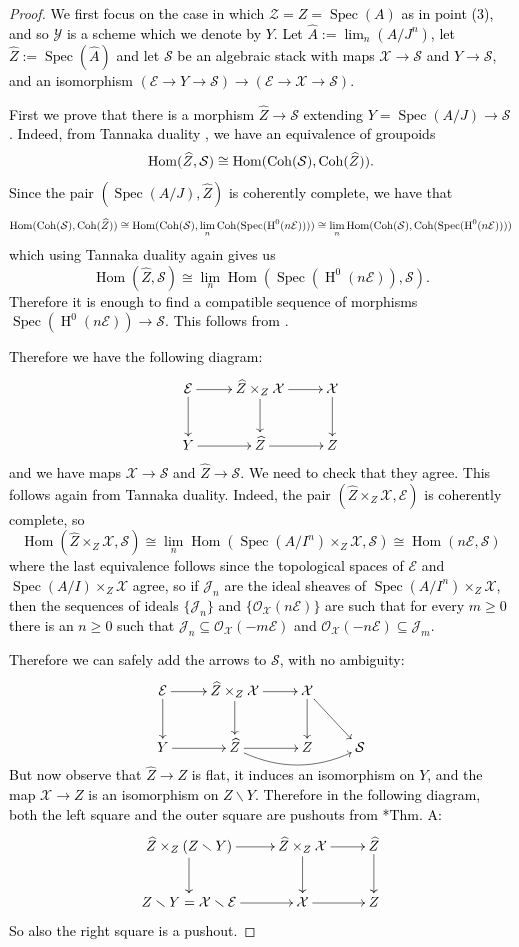 \documentclass{amsart}
\newcommand{\oH}{\operatorname{H}}
\newcommand{\cE}{\mathcal{E}}
\newcommand{\cJ}{\mathcal{J}}
\newcommand{\cO}{\mathcal{O}}
\newcommand{\cS}{\mathcal{S}}
\newcommand{\cX}{\mathcal{X}}
\newcommand{\cY}{\mathcal{Y}}
\newcommand{\cZ}{\mathcal{Z}}
\newcommand{\spec}{\operatorname{Spec}}
\newcommand{\Hom}{\operatorname{Hom}}
\theoremstyle{definition}
\begin{document}
\begin{proof}
\textcolor{black}{We first focus on the case in which $\cZ=Z=\spec(A)$ as in point (3), and so $\cY$ is a scheme which we denote by $Y$. Let $\widehat{A}:=\lim_n(A/J^n)$, let $\widehat{Z}:=\spec(\widehat A)$ and let $\cS$ be an algebraic stack with maps $\cX\to \cS$ and $Y\to \cS$, and an isomorphism $(\cE\to Y\to \cS)\to (\cE\to \cX\to \cS)$.
}

\textcolor{black}{First we prove that there is a morphism $\widehat{Z}\to \cS$ extending $Y=\spec(A/J)\to \cS$.
    Indeed, from Tannaka duality \cite[Thm. 1.1]{HR19}, we have an equivalence of groupoids 
 $$\Hom(\widehat Z,\cS) \cong \Hom( {\rm Coh}(\cS), {\rm Coh}(\widehat{Z})).$$
 Since the pair  $(\spec(A/J), \widehat{Z})$ is coherently complete, we have that 
 $$ \Hom({\rm Coh}(\cS), {\rm Coh}(\widehat{Z})) \cong  \Hom({\rm Coh}(\cS), \lim_n {\rm Coh}(\spec(\oH^0(n\cE)))) \cong \lim_n \Hom({\rm Coh}(\cS), {\rm Coh}(\spec(\oH^0(n\cE))))  $$
 which using Tannaka duality again gives us 
 $$ \Hom(\widehat{Z}, \cS) \cong \lim_n \Hom(\spec(\oH^0(n\cE)), \cS).$$
Therefore it is enough to find a compatible sequence of morphisms $\spec(\oH^0(n\cE))\to \cS$. This follows from .}

\textcolor{black}{Therefore we have the following diagram:
$$\xymatrix{\cE\ar[d] \ar[r] & \widehat{Z}\times_Z\cX\ar[d] \ar[r] & \cX\ar[d] \\ Y\ar[r]& \widehat{Z}\ar[r] &Z}$$and we have maps $\cX\to \cS$ and $\widehat{Z}\to \cS$. We need to check that they agree. This follows again from Tannaka duality. Indeed, the pair $(\widehat{Z}\times_Z\cX,\cE)$ is coherently complete, so $$\Hom(\widehat{Z}\times_Z \cX, \cS) \cong \lim_n \Hom(\spec(A/I^n)\times_Z\cX, \cS) \cong \Hom(n\cE, \cS)$$where the last equivalence follows since the topological spaces of $\cE$ and $\spec(A/I)\times_Z\cX$ agree, so if $\cJ_n$ are the ideal sheaves of $\spec(A/I^n)\times_Z\cX$, then the sequences of ideals $\{\cJ_n\}$ and $\{\cO_\cX(n\cE)\}$ are such that for every $m\ge 0$ there is an $n\ge 0$ such that $\cJ_n\subseteq \cO_\cX(-m\cE)$ and $\cO_\cX(-n\cE)\subseteq \cJ_m$.}



\textcolor{black}{Therefore we can safely add the arrows to $\cS$, with no ambiguity:$$\xymatrix{\cE\ar[d] \ar[r] & \widehat{Z}\times_Z\cX\ar[d] \ar[r] & \cX\ar[d]\ar[dr]& \\ Y\ar[r]& \widehat{Z}\ar[r] \ar@/_1pc/[rr] &Z &\cS}$$ But now observe that $\widehat{Z}\to Z$ is flat, it induces an isomorphism on $Y$, and the map $\cX\to Z$ is an isomorphism on $Z\smallsetminus Y$. Therefore in the following diagram, both the left square and the outer square are pushouts from \cite{mayer_viet_squares}*{Thm. A}:
$$\xymatrix{\widehat{Z}\times_Z(Z\smallsetminus Y) \ar[r] \ar[d] & \widehat{Z}\times_Z\cX\ar[d]\ar[r] & \widehat{Z}\ar[d]\\ Z\smallsetminus Y = \cX\smallsetminus \cE\ar[r] & \cX \ar[r] & Z}$$
So also the right square is a pushout.}


\end{proof}
\end{document}
